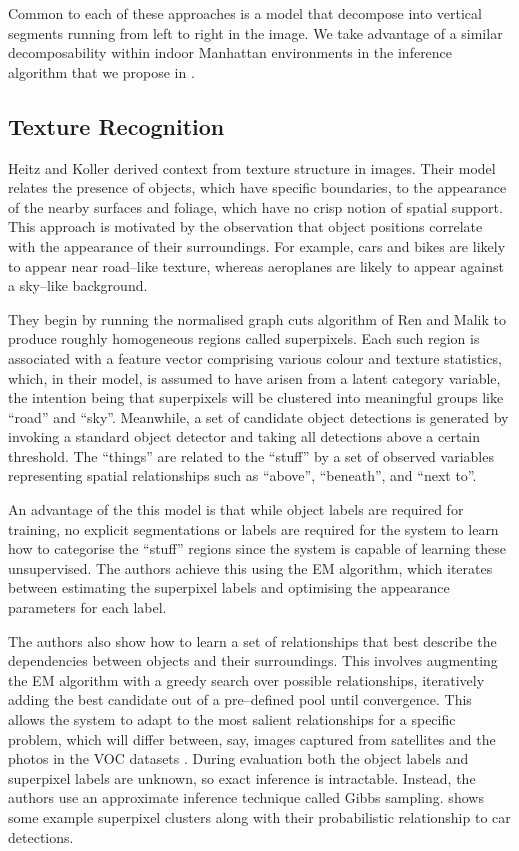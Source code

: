 Common to each of these approaches is a model that decompose into
vertical segments running from left to right in the image. We take
advantage of a similar decomposability within indoor Manhattan
environments in the inference algorithm that we propose in
.

\subsection{Texture Recognition}

Heitz and Koller \cite{Heitz08} derived context from texture structure
in images. Their model relates the presence of objects, which have
specific boundaries, to the appearance of the nearby surfaces and
foliage, which have no crisp notion of spatial support. This approach
is motivated by the observation that object positions correlate with
the appearance of their surroundings. For example, cars and bikes are
likely to appear near road--like texture, whereas aeroplanes are
likely to appear against a sky--like background.

They begin by running the normalised graph cuts algorithm of Ren and
Malik \cite{Ren03} to produce roughly homogeneous regions called
superpixels. Each such region is associated with a feature vector
comprising various colour and texture statistics, which, in their
model, is assumed to have arisen from a latent category variable, the
intention being that superpixels will be clustered into meaningful
groups like ``road'' and ``sky''. Meanwhile, a set of candidate object
detections is generated by invoking a standard object detector and
taking all detections above a certain threshold. The ``things'' are
related to the ``stuff'' by a set of observed variables representing
spatial relationships such as ``above'', ``beneath'', and ``next to''.

An advantage of the this model is that while object labels are
required for training, no explicit segmentations or labels are
required for the system to learn how to categorise the ``stuff''
regions since the system is capable of learning these
unsupervised. The authors achieve this using the EM algorithm, which
iterates between estimating the superpixel labels and optimising the
appearance parameters for each label.

The authors also show how to learn a set of relationships that best
describe the dependencies between objects and their surroundings. This
involves augmenting the EM algorithm with a greedy search over
possible relationships, iteratively adding the best candidate out of a
pre--defined pool until convergence. This allows the system to adapt
to the most salient relationships for a specific problem, which will
differ between, say, images captured from satellites and the photos in
the VOC datasets \cite{VOC2009}. During evaluation both the object
labels and superpixel labels are unknown, so exact inference is
intractable. Instead, the authors use an approximate inference
technique called Gibbs sampling.   shows some
example superpixel clusters along with their probabilistic
relationship to car detections.

